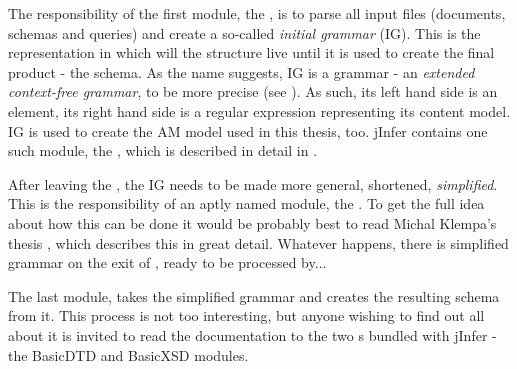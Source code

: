 The responsibility of the first module, the , is to parse all input files (documents, schemas and queries) and create a so-called \textit{initial grammar} (IG). 
This is the representation in which will the structure live until it is used to create the final product - the schema. As the name suggests, IG is a grammar - an \textit{extended context-free grammar}, to be more precise (see \cite{extendedcfg}). As such, its left hand side is an element, its right hand side is a regular expression representing its content model. IG is used to create the AM model used in this thesis, too. jInfer contains one such module, the , which is described in detail in \cite{basiciggdoc}.

After leaving the , the IG needs to be made more general, shortened, \textit{simplified}. This is the responsibility of an aptly named module, the . To get the full idea about how this can be done it would be probably best to read Michal Klempa's thesis \cite{anti}, which describes this in great detail. Whatever happens, there is simplified grammar on the exit of , ready to be processed by...

The last module,  takes the simplified grammar and creates the resulting schema from it. This process is not too interesting, but anyone wishing to find out all about it is invited to read the documentation to the two s bundled with jInfer - the BasicDTD and BasicXSD modules.
